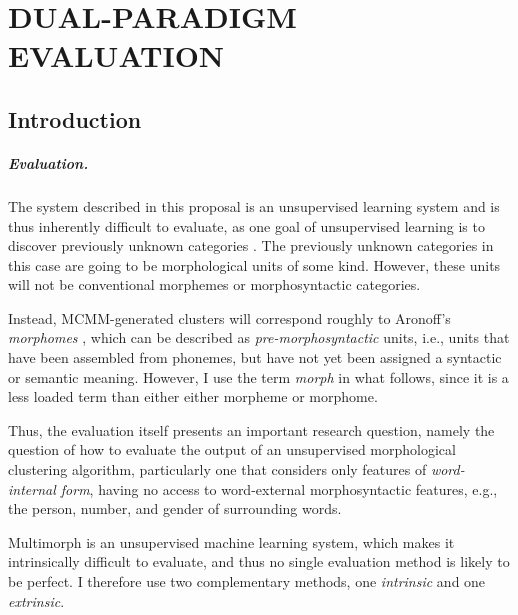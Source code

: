 \chapter{DUAL-PARADIGM EVALUATION}
\label{ch:eval}

\section{Introduction}

\paragraph{Evaluation.} The system described in this proposal is an unsupervised 
learning system and is thus inherently difficult to evaluate, as one goal of 
unsupervised learning is to discover previously unknown categories \citep{parsons:2004}.
The previously unknown categories in this case are going to be morphological 
units of some kind. However, these units will not be conventional morphemes 
or morphosyntactic categories. 

Instead, MCMM-generated clusters will correspond roughly to Aronoff's 
\emph{morphomes} \citep{aronoff:1994}, which can be described as 
\emph{pre-morphosyntactic} units, i.e., units that have been assembled from 
phonemes, but have not yet been assigned 
a syntactic or semantic meaning. However,  I use the term \emph{morph} in what follows, since it is a less loaded term than either
either morpheme or morphome.

Thus, the evaluation itself presents an important research question, namely the question 
of how to evaluate the output of an unsupervised morphological clustering algorithm, 
particularly one that considers only features of \emph{word-internal form}, having no 
access to word-external morphosyntactic features, e.g., the person, number, and 
gender of  surrounding words.

Multimorph is an unsupervised machine learning system, which makes it 
intrinsically difficult to evaluate, and thus no single 
evaluation method is likely to be perfect. I therefore use two complementary methods, %
one \emph{intrinsic} and one \emph{extrinsic}.

